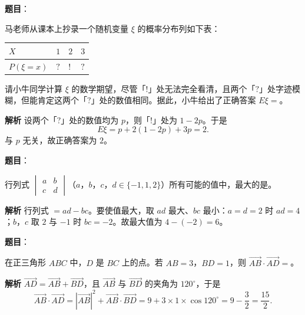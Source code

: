 \begin{answer}

\textbf{题目}：

马老师从课本上抄录一个随机变量 $\xi$ 的概率分布列如下表：

\begin{center}
\begin{tabular}{llll}
\toprule
$X$ & $1$ & $2$ & $3$ \\
\midrule
$P(\xi=x)$ & $?$ & $!$ & $?$ \\
\bottomrule
\end{tabular}
\end{center}

请小牛同学计算 $\xi$ 的数学期望，尽管「$!$」处无法完全看清，且两个「$?$」处字迹模糊，但能肯定这两个「$?$」处的数值相同。据此，小牛给出了正确答案 $E\xi=$\gkblank{}。

\textbf{解析}
设两个「$?$」处的数值均为 $p$，则「$!$」处为 $1-2p$。于是
\nopagebreak[4]
\[E\xi=p+2(1-2p)+3p=2.\]
与 $p$ 无关，故正确答案为 $2$。


\end{answer}
\begin{answer}

\textbf{题目}：

行列式 $\begin{vmatrix}a&b\\ c&d\end{vmatrix}$（$a$，$b$，$c$，$d\in\{-1,1,2\}$）所有可能的值中，最大的是\gkblank{}。

\textbf{解析}
行列式 $=ad-bc$。要使值最大，取 $ad$ 最大、$bc$ 最小：$a=d=2$ 时 $ad=4$；$b$，$c$ 取 $2$ 与 $-1$ 时 $bc=-2$。故最大值为 $4-(-2)=6$。


\end{answer}
\begin{answer}

\textbf{题目}：

在正三角形 $ABC$ 中，$D$ 是 $BC$ 上的点。若 $AB=3$，$BD=1$，则 $\overrightarrow{AB}\cdot\overrightarrow{AD}=$\gkblank{}。

\textbf{解析}
$\overrightarrow{AD}=\overrightarrow{AB}+\overrightarrow{BD}$，且 $\overrightarrow{AB}$ 与 $\overrightarrow{BD}$ 的夹角为 $120^\circ$，于是
\nopagebreak[4]
\[\overrightarrow{AB}\cdot\overrightarrow{AD}=|\overrightarrow{AB}|^2+\overrightarrow{AB}\cdot\overrightarrow{BD}=9+3\times1\times\cos120^\circ=9-\frac32=\frac{15}2.\]


\end{answer}
